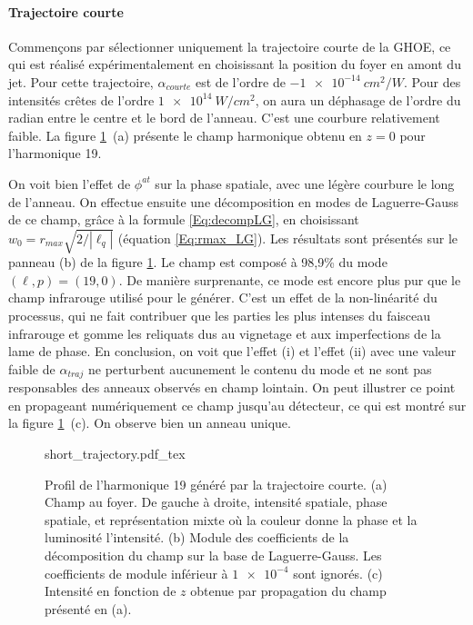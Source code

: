 \paragraph*{Trajectoire courte} Commençons par sélectionner uniquement la trajectoire courte de la GHOE, ce qui est réalisé expérimentalement en choisissant la position du foyer en amont du jet. Pour cette trajectoire, $\alpha_{courte}$ est de l'ordre de $\SI{-1e-14}{cm^2/W}$. Pour des intensités crêtes de l'ordre $\SI{1e14}{W/cm^2}$, on aura un déphasage de l'ordre du radian entre le centre et le bord de l'anneau. C'est une courbure relativement faible. La figure \ref{Fig:DecompShort}~(a) présente le champ harmonique obtenu en $z=0$ pour l'harmonique 19.

On voit bien l'effet de $\phi^{at}$ sur la phase spatiale, avec une légère courbure le long de l'anneau. On effectue ensuite une décomposition en modes de Laguerre-Gauss de ce champ, grâce à la formule \ref{Eq:decompLG}, en choisissant $w_0 = r_{max}\sqrt{2/|\ell_q|}$ (équation \ref{Eq:rmax_LG}). Les résultats sont présentés sur le panneau (b) de la figure \ref{Fig:DecompShort}. Le champ est composé à 98,9\% du mode $(\ell,p) = (19,0)$. De manière surprenante, ce mode est encore plus pur que le champ infrarouge utilisé pour le générer. C'est un effet de la non-linéarité du processus, qui ne fait contribuer que les parties les plus intenses du faisceau infrarouge et gomme les reliquats dus au vignetage et aux imperfections de la lame de phase. En conclusion, on voit que l'effet (i) et l'effet (ii) avec une valeur faible de $\alpha_{traj}$ ne perturbent aucunement le contenu du mode et ne sont pas responsables des anneaux observés en champ lointain. On peut illustrer ce point en propageant numériquement ce champ jusqu'au détecteur, ce qui est montré sur la figure \ref{Fig:DecompShort}~(c). On observe bien un anneau unique.
\begin{figure}[!ht]
\centering
\def\svgwidth{\columnwidth}
{short_trajectory.pdf_tex}
\caption{Profil de l'harmonique 19 généré par la trajectoire courte. (a) Champ au foyer. De gauche à droite, intensité spatiale, phase spatiale, et représentation mixte où la couleur donne la phase et la luminosité l'intensité. (b) Module des coefficients de la décomposition du champ sur la base de Laguerre-Gauss. Les coefficients de module inférieur à $\num{1e-4}$ sont ignorés. (c) Intensité en fonction de $z$ obtenue par propagation du champ présenté en (a).}
\label{Fig:DecompShort}
\end{figure}

